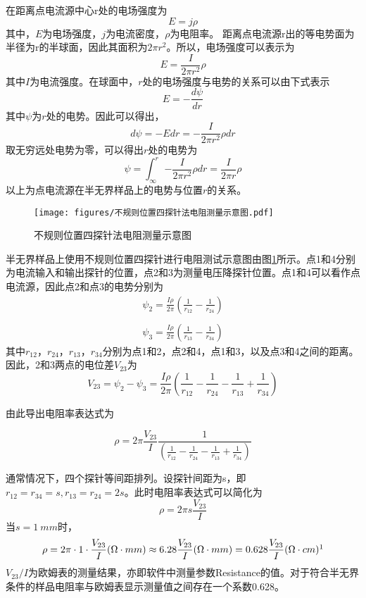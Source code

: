 \documentclass[12pt]{ctexart}
\begin{document}
在距离点电流源中心r处的电场强度为
 \[E = j\rho \]
其中，$E$为电场强度，$j$为电流密度，$\rho$为电阻率。
距离点电流源r出的等电势面为半径为r的半球面，因此其面积为$2\pi r^{2}$。所以，电场强度可以表示为
 \[E = \frac{I}{{2\pi {r^2}}}\rho \]
其中$I$为电流强度。在球面中，$r$处的电场强度与电势的关系可以由下式表示
\[E =  - \frac{{d\psi }}{{dr}}\]
其中$\psi$为$r$处的电势。因此可以得出，
\[d\psi  =  - Edr =  - \frac{I}{{2\pi {r^2}}}\rho dr\]
取无穷远处电势为零，可以得出$r$处的电势为
\[\psi  = \int_\infty ^r { - \frac{I}{{2\pi {r^2}}}\rho dr}  = \frac{I}{{2\pi r}}\rho \]
以上为点电流源在半无界样品上的电势与位置$r$的关系。

\begin{figure}[H]
	\centering
	\texttt{[image: figures/不规则位置四探针法电阻测量示意图.pdf]}
	\caption{不规则位置四探针法电阻测量示意图\label{figure:random position four point probe method illustration}}
\end{figure}




半无界样品上使用不规则位置四探针进行电阻测试示意图由图\ref{figure:random position four point probe method illustration}所示。点1和4分别为电流输入和输出探针的位置，点2和3为测量电压降探针位置。点1和4可以看作点电流源，因此点2和点3的电势分别为
\[\begin{array}{l}
{\psi _2} = \frac{{I\rho }}{{2\pi }}\left( {\frac{1}{{{r_{12}}}} - \frac{1}{{{r_{24}}}}} \right)\\\\

{\psi _3} = \frac{{I\rho }}{{2\pi }}\left( {\frac{1}{{{r_{13}}}} - \frac{1}{{{r_{34}}}}} \right)
\end{array}\]
其中$r_{12}$，$r_{24}$，$r_{13}$，$r_{34}$分别为点1和2，点2和4，点1和3，以及点3和4之间的距离。
因此，2和3两点的电位差$V_{23}$为
\[{V_{23}} = {\psi _2} - {\psi _3} = \frac{{I\rho }}{{2\pi }}\left( {\frac{1}{{{r_{12}}}} - \frac{1}{{{r_{24}}}} - \frac{1}{{{r_{13}}}} + \frac{1}{{{r_{34}}}}} \right)\]

由此导出电阻率表达式为

\[\rho  = 2\pi \frac{{{V_{23}}}}{I}\frac{1}{{\left( {\frac{1}{{{r_{12}}}} - \frac{1}{{{r_{24}}}} - \frac{1}{{{r_{13}}}} + \frac{1}{{{r_{34}}}}} \right)}}\]

通常情况下，四个探针等间距排列。设探针间距为s，即$r_{12}=r_{34}=s, r_{13}=r_{24}=2s$。此时电阻率表达式可以简化为
\[\rho  = 2\pi s \frac{{{V_{23}}}}{I}\]
当$s=1\ mm$时，
\[\rho  = 2\pi \cdot 1\cdot \frac{{{V_{23}}}}{I}(\Omega\cdot  mm) \approx 6.28 \frac{{{V_{23}}}}{I}(\Omega\cdot  mm) = 0.628 \frac{{{V_{23}}}}{I}(\Omega\cdot  cm)\footnotemark\]\label{eqa:resistivity}
$V_{23}/I$为欧姆表的测量结果，亦即软件中测量参数Resistance的值。对于符合半无界条件的样品电阻率与欧姆表显示测量值之间存在一个系数0.628。
\end{document}
